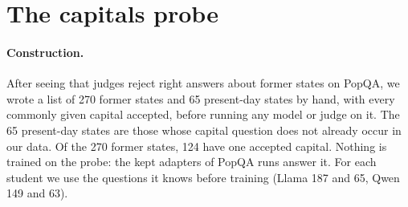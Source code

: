 \section{The capitals probe}
\label{app:capitals}

\paragraph{Construction.} After seeing that judges reject right answers about former states on PopQA, we wrote a list of 270 former states and 65 present-day states by hand, with every commonly given capital accepted, before running any model or judge on it. The 65 present-day states are those whose capital question does not already occur in our data. Of the 270 former states, 124 have one accepted capital. Nothing is trained on the probe: the kept adapters of PopQA runs answer it. For each student we use the questions it knows before training (Llama 187 and 65, Qwen 149 and 63).

\begin{table}[t]
\small
\centering
\setlength{\tabcolsep}{5pt}
\caption{Every judge at every cut (the 28 points of Figure~\ref{fig:dose}), the answer key and the student's own vote. \emph{Rejected of 12}: how many of the twelve known former-state training answers the grader rejects. \emph{Abstention}: on PopQA held-out questions. \emph{Model refuses}: share of known former-state and present-day probe capitals refused. \emph{Judge-free}: former-state refusal of the three models trained with random rejections that are nearest in abstention. Two to six runs per cell. For Qwen the key-matched cut coincides with the 50\% cut. The 20-of-32 vote is the grader of Section~\ref{sec:own}, with all its runs at that cut (three with Qwen, six with Llama).}
\label{tab:dose}
\end{table}

